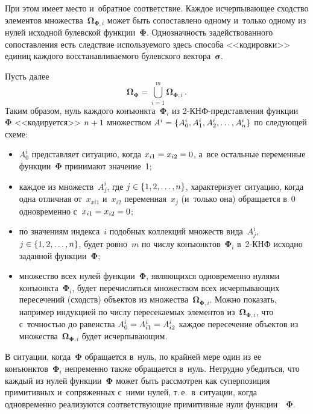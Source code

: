 \begin{multicols}{2}
  При этом имеет место и~обратное соответствие. Каждое исчерпывающее 
сходство элементов множества~$\boldsymbol{\Omega}_{\boldsymbol{\Phi}, i}$ 
может быть сопоставлено одно\-му и~только одно\-му из нулей исходной булевской 
функции~$\boldsymbol{\Phi}$. Однозначность задействованного сопоставления 
есть следствие используемого здесь способа <<кодировки>> единиц каждого 
восстанавливаемого булевского вектора~${\boldsymbol{\sigma}}$. 
  
  Пусть далее
  \begin{equation}
  {\boldsymbol{\Omega}}_{\boldsymbol{\Phi}} =\mathop{\bigcup}\limits^m_{i=1} 
\boldsymbol{\Omega}_{\boldsymbol{\Phi}, i}\,.
   \label{e4-gr}
   \end{equation}
Таким образом, нуль каждого конъюнкта~$\boldsymbol{\Phi}_i$ из  
\mbox{2-КНФ}-пред\-став\-ле\-ния функции~$\boldsymbol{\Phi}$ <<кодируется>> 
$n\hm+1$ множеством $A^i\hm = \{A_0^i, A_1^i, A_2^i, \ldots , A_n^i\}$ по 
следующей схеме:
\begin{itemize}
\item $A_0^i$ представляет ситуацию, когда $x_{i1}\hm = x_{i2}\hm = 0$, а~все 
остальные переменные функции~$\boldsymbol{\Phi}$ принимают значение~1;
\item каждое из множеств~$A_j^i$, где $j\hm\in\{1, 2, \ldots , n\}$, 
характеризует ситуацию, когда одна отличная от~$x_{xi1}$ и~$x_{i2}$ 
переменная~$x_j$ (и~только она) обращается в~0 одновременно с~$x_{i1}\hm = 
x_{i2}\hm = 0$;
\item по значениям индекса~$i$ подобных коллекций множеств вида~$A_j^i$, 
$j\hm\in \{1, 2, \ldots, n\}$, будет ровно~$m$ по числу 
конъюнктов~$\boldsymbol{\Phi}_i$ в~2-КНФ исходно заданной 
функции~$\boldsymbol{\Phi}$;
\item множество всех нулей функции~$\boldsymbol{\Phi}$, являющихся 
одновременно нулями конъюнкта~$\boldsymbol{\Phi}_i$, будет 
перечисляться множеством всех ис\-чер\-пы\-вающих пересечений (сходств) 
объектов из множества~$\boldsymbol{\Omega}_{\boldsymbol{\Phi}, i}$. Можно 
показать, например индукцией по числу пересекаемых элементов 
из~$\boldsymbol{\Omega}_{\boldsymbol{\Phi}, i}$, что с~точностью до 
равенства $A_0^i\hm= A^i_{i1}\hm = A^i_{i2}$ каж\-дое пересечение объектов 
из множества~$\boldsymbol{\Omega}_{\boldsymbol{\Phi}, i}$ будет 
исчерпывающим.
\end{itemize}
  
  В ситуации, когда~$\boldsymbol{\Phi}$ обращается в~нуль, по крайней мере 
один из ее конъюнктов~$\boldsymbol{\Phi}_i$ непременно также обращается 
в~нуль. Нетрудно убедиться, что каждый из нулей функции~$\boldsymbol{\Phi}$ 
может быть рассмотрен как суперпозиция примитивных и~сопряженных с~ними 
нулей, т.\,е.\ в~ситуации, когда одновременно реализуются соответствующие 
примитивные нули функции~~$\boldsymbol{\Phi}$.
  

\end{multicols}
